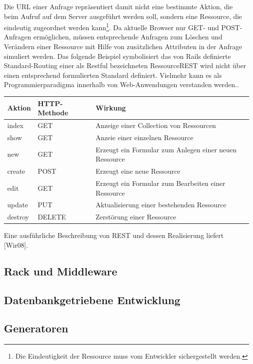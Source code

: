 Die URL einer Anfrage repräsentiert damit nicht eine bestimmte Aktion, die beim Aufruf auf dem Server ausgeführt werden soll, sondern eine Ressource, die eindeutig zugeordnet werden kann\footnote{Die Eindeutigkeit der Ressource muss vom Entwickler sichergestellt werden.}.
Da aktuelle Browser nur GET- und POST-Anfragen ermöglichen, müssen entsprechende Anfragen zum Löschen und Verändern einer Ressource mit Hilfe von zusätzlichen Attributen in der Anfrage simuliert werden. Das folgende Beispiel symbolisiert das von Rails definierte Standard-Routing einer als Restful bezeichneten Ressource{REST wird nicht über einen entsprechend formulierten Standard definiert. Vielmehr kann es als Programmierparadigma innerhalb von Web-Anwendungen verstanden werden.}.


\begin{table}[!h]
\center
\begin{tabular}[!ht]{|l|l|p{6cm}|}
\hline
Aktion & HTTP-Methode & Wirkung\\
\hline
index & GET & Anzeige einer Collection von Ressourcen\\
\hline
show & GET & Anzeie einer einzelnen Ressource\\
\hline
new & GET & Erzeugt ein Formular zum Anlegen einer neuen Ressource\\
\hline
create & POST & Erzeugt eine neue Ressource\\
\hline
edit & GET & Erzeugt ein Formular zum Bearbeiten einer Ressource\\
\hline
update & PUT & Aktualisierung einer bestehenden Ressource\\
\hline
destroy & DELETE & Zerstörung einer Ressource\\
\hline
\end{tabular}
\end{table}
Eine ausführliche Beschreibung von REST und dessen Realisierung liefert [Wir08].

\subsection{Rack und Middleware}
\subsection{Datenbankgetriebene Entwicklung}
\subsection{Generatoren}

